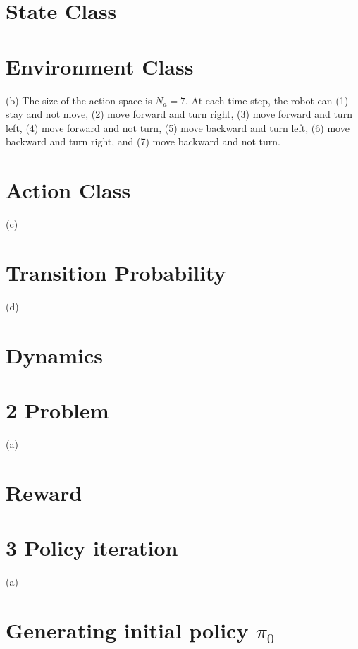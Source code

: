 \documentclass{article}
\begin{document}
	\section*{State Class}
	 \vspace{30pt}
	\section*{Environment Class}
	 \vspace{30pt}
	
	(b) The size of the action space is $N_{a} = 7$. At each time step, the robot can (1) stay and not move, (2) move forward and turn right, (3) move forward and turn left, (4) move forward and not turn, (5) move backward and turn left, (6) move backward and turn right, and (7) move backward and not turn.
	\section*{Action Class}
	 \vspace{30pt}
	
	\newpage
	(c)
	\section*{Transition Probability}
	 \vspace{30pt}
	
	\newpage
	(d)
	\section*{Dynamics}
	
	
	\newpage
	\section*{2  Problem}

	(a)
	\section*{Reward}
	
	
	\newpage
	\section*{3  Policy iteration}
	(a)
	\section*{Generating initial policy $\pi_{0}$}
	
	
	\newpage
	
	
\end{document}
